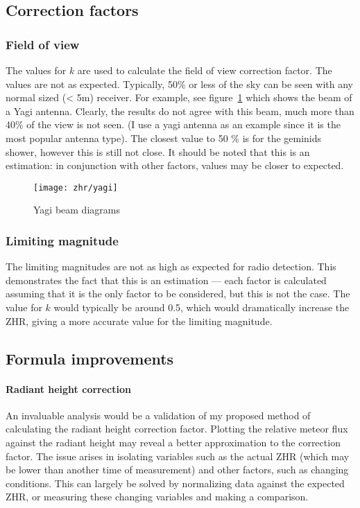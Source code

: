 \subsection{Correction factors}
\subsubsection{Field of view}
The values for $k$ are used to calculate the field of view correction factor. The values are not as expected. Typically, 50\% or less of the sky can be seen with any normal sized (< 5m) receiver. For example, see figure~\ref{fig:zhr:beam} which shows the beam of a Yagi antenna. Clearly, the results do not agree with this beam, much more than 40\% of the view is not seen. (I use a yagi antenna as an example since it is the most popular antenna type). The closest value to 50 \% is for the geminids shower, however this is still not close. It should be noted that this is an estimation: in conjunction with other factors, values may be closer to expected. 
\begin{figure}[h!]
	\centering
	\texttt{[image: zhr/yagi]}
	\caption{Yagi beam diagrams \cite{yagi}
		\label{fig:zhr:beam}}
\end{figure}
\subsubsection{Limiting magnitude}
The limiting magnitudes are not as high as expected for radio detection. This demonstrates the fact that this is an estimation --- each factor is calculated assuming that it is the only factor to be considered, but this is not the case. The value for $k$ would typically be around 0.5, which would dramatically increase the ZHR, giving a more accurate value for the limiting magnitude.
\subsection{Formula improvements}
\paragraph{Radiant height correction\\}
An invaluable analysis would be a validation of my proposed method of calculating the radiant height correction factor. Plotting the relative meteor flux against the radiant height may reveal a better approximation to the correction factor. The issue arises in isolating variables such as the actual ZHR (which may be lower than another time of measurement) and other factors, such as changing conditions. This can largely be solved by normalizing data against the expected ZHR, or measuring these changing variables and making a comparison.
